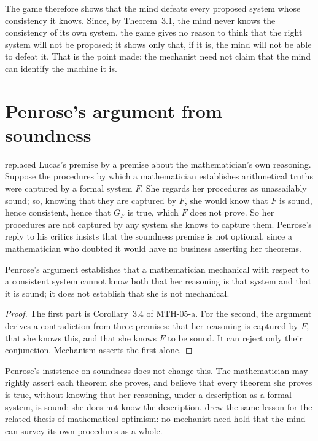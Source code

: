 \documentclass{situationist-preprint}
\begin{document}
The game therefore shows that the mind defeats every proposed system whose consistency it knows. Since, by Theorem~3.1, the mind never knows the consistency of its own system, the game gives no reason to think that the right system will not be proposed; it shows only that, if it is, the mind will not be able to defeat it. That is the point \citet{Benacerraf1967} made: the mechanist need not claim that the mind can identify the machine it is.

\section{Penrose's argument from soundness}\label{s:penrose}

\citet{Penrose1994} replaced Lucas's premise by a premise about the mathematician's own reasoning. Suppose the procedures by which a mathematician establishes arithmetical truths were captured by a formal system $F$. She regards her procedures as unassailably sound; so, knowing that they are captured by $F$, she would know that $F$ is sound, hence consistent, hence that $G_F$ is true, which $F$ does not prove. So her procedures are not captured by any system she knows to capture them. Penrose's reply to his critics \citep{Penrose1996} insists that the soundness premise is not optional, since a mathematician who doubted it would have no business asserting her theorems.

\begin{proposition}\label{p:penrose}
Penrose's argument establishes that a mathematician mechanical with respect to a consistent system cannot know both that her reasoning is that system and that it is sound; it does not establish that she is not mechanical.
\end{proposition}

\begin{proof}
The first part is Corollary~3.4 of MTH-05-a. For the second, the argument derives a contradiction from three premises: that her reasoning is captured by $F$, that she knows this, and that she knows $F$ to be sound. It can reject only their conjunction. Mechanism asserts the first alone.
\end{proof}

Penrose's insistence on soundness does not change this. The mathematician may rightly assert each theorem she proves, and believe that every theorem she proves is true, without knowing that her reasoning, under a description as a formal system, is sound: she does not know the description. \citet{Shapiro1998} drew the same lesson for the related thesis of mathematical optimism: no mechanist need hold that the mind can survey its own procedures as a whole.
\end{document}
